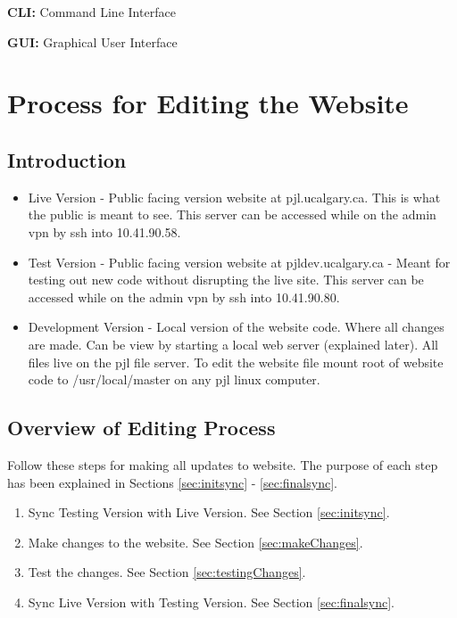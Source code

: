 \documentclass[justified]{LabArx3_5_1}
\begin{document}
{\bf CLI:} Command Line Interface

{\bf GUI:} Graphical User Interface



\chapter{Process for Editing the Website}

\section{Introduction}

\begin{itemize}
\item Live Version - Public facing version website at pjl.ucalgary.ca. This is what the public is meant to see. This server can be accessed while on the admin vpn by ssh into 10.41.90.58.

\item Test Version - Public facing version website at pjldev.ucalgary.ca - Meant for testing out new code without disrupting the live site. This server can be accessed while on the admin vpn by ssh into 10.41.90.80.

\item Development Version - Local version of the website code. Where all changes are made. Can be view by starting a local web server (explained later). All files live on the pjl file server. To edit the website file mount root of website code to /usr/local/master on any pjl linux computer.
\end{itemize}

\section{Overview of Editing Process}

Follow these steps for making all updates to website. The purpose of each step has been explained in Sections \ref{sec:initsync} - \ref{sec:finalsync}.

\begin{enumerate}
\item Sync Testing Version with Live Version. See Section \ref{sec:initsync}.
\item Make changes to the website. See Section \ref{sec:makeChanges}.
\item Test the changes. See Section  \ref{sec:testingChanges}.
\item Sync Live Version with Testing Version. See Section \ref{sec:finalsync}.
\end{enumerate}
\end{document}
